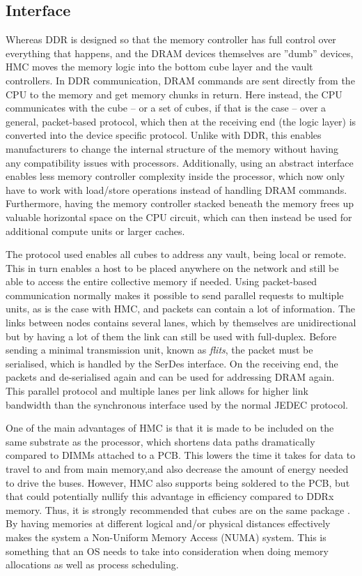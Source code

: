 \subsection{Interface}
Whereas DDR is designed so that the memory controller has full control over everything that happens, and the DRAM devices themselves are ''dumb'' devices, HMC moves the memory logic into the bottom cube layer and the vault controllers. In DDR communication, DRAM commands are sent directly from the CPU to the memory and get memory chunks in return. Here instead, the CPU communicates with the cube -- or a set of cubes, if that is the case -- over a general, packet-based protocol, which then at the receiving end (the logic layer) is converted into the device specific protocol. Unlike with DDR, this enables manufacturers to change the internal structure of the memory without having any compatibility issues with processors. Additionally, using an abstract interface enables less memory controller complexity inside the processor, which now only have to work with load/store operations instead of handling DRAM commands. Furthermore, having the memory controller stacked beneath the memory frees up valuable horizontal space on the CPU circuit, which can then instead be used for additional compute units or larger caches.  
\bigskip

The protocol used enables all cubes to address any vault, being local or remote. This in turn enables a host to be placed anywhere on the network and still be able to access the entire collective memory if needed. Using packet-based communication normally makes it possible to send parallel requests to multiple units, as is the case with HMC, and packets can contain a lot of information. The links between nodes contains several lanes, which by themselves are unidirectional but by having a lot of them the link can still be used with full-duplex. Before sending a minimal transmission unit, known as \emph{flits}, the packet must be serialised, which is handled by the SerDes interface. On the receiving end, the packets and de-serialised again and can be used for addressing DRAM again. This parallel protocol and multiple lanes per link allows for higher link bandwidth than the synchronous interface used by the normal JEDEC protocol. 
\bigskip

One of the main advantages of HMC is that it is made to be included on the same substrate as the processor, which shortens data paths dramatically compared to DIMMs attached to a PCB. This lowers the time it takes for data to travel to and from main memory,and also decrease the amount of energy needed to drive the buses. However, HMC also supports being soldered to the PCB, but that could potentially nullify this advantage in efficiency compared to DDRx memory. Thus, it is strongly recommended that cubes are on the same package \cite{hybrid2013hybrid}. By having memories at different logical and/or physical distances effectively makes the system a Non-Uniform Memory Access (NUMA) system. This is something that an OS needs to take into consideration when doing memory allocations as well as process scheduling. 
\bigskip

